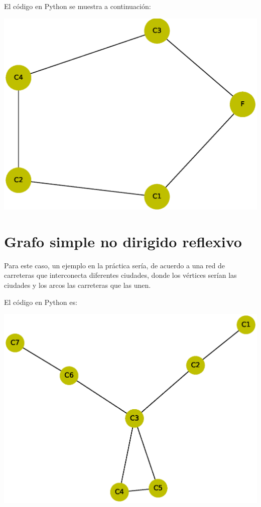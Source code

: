 \documentclass[10pt,a4paper]{article}
\begin{document}
El código en Python se muestra a continuación:



\begin{center}

\includegraphics[scale=0.4]{GNDC}

\end{center}

\section{Grafo simple no dirigido reflexivo}

Para este caso, un ejemplo en la práctica sería, de acuerdo a \cite{art2} una red de carreteras que interconecta diferentes ciudades, donde los vértices serían las ciudades y los arcos las carreteras que las unen.\vspace{.4cm}

El código en Python es:
 


\begin{center}

\includegraphics[scale=0.4]{GNDR}

\end{center}
\end{document}
